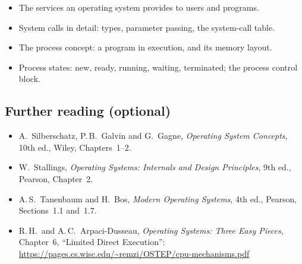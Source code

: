 \documentclass[11pt,a4paper]{article}
\begin{document}
\begin{itemize}
  \item The services an operating system provides to users and programs.
  \item System calls in detail: types, parameter passing, the system-call table.
  \item The process concept: a program in execution, and its memory layout.
  \item Process states: new, ready, running, waiting, terminated; the process control block.
\end{itemize}

\subsection*{Further reading (optional)}
\begin{itemize}
  \item A.\ Silberschatz, P.\,B.\ Galvin and G.\ Gagne, \emph{Operating System Concepts}, 10th ed., Wiley, Chapters~1--2.
  \item W.\ Stallings, \emph{Operating Systems: Internals and Design Principles}, 9th ed., Pearson, Chapter~2.
  \item A.\,S.\ Tanenbaum and H.\ Bos, \emph{Modern Operating Systems}, 4th ed., Pearson, Sections~1.1 and~1.7.
  \item R.\,H.\ and A.\,C.\ Arpaci-Dusseau, \emph{Operating Systems: Three Easy Pieces}, Chapter~6, ``Limited Direct Execution'': \url{https://pages.cs.wisc.edu/~remzi/OSTEP/cpu-mechanisms.pdf}
\end{itemize}
\end{document}
